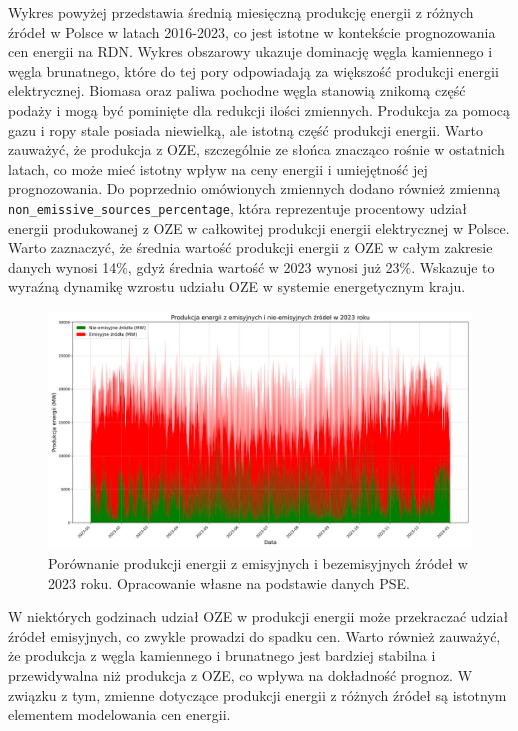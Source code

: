 Wykres powyżej przedstawia średnią miesięczną produkcję energii z różnych źródeł w Polsce w latach 2016-2023, co jest istotne w kontekście prognozowania cen energii na RDN. Wykres obszarowy ukazuje dominację węgla kamiennego i węgla brunatnego, które do tej pory odpowiadają za większość produkcji energii elektrycznej. Biomasa oraz paliwa pochodne węgla stanowią znikomą część podaży i mogą być pominięte dla redukcji ilości zmiennych. Produkcja za pomocą gazu i ropy stale posiada niewielką, ale istotną część produkcji energii. Warto zauważyć, że produkcja z OZE, szczególnie ze słońca znacząco rośnie w ostatnich latach, co może mieć istotny wpływ na ceny energii i umiejętność jej prognozowania. Do poprzednio omówionych zmiennych dodano również zmienną \texttt{non\_emissive\_sources\_percentage}, która reprezentuje procentowy udział energii produkowanej z OZE w całkowitej produkcji energii elektrycznej w Polsce. Warto zaznaczyć, że średnia wartość produkcji energii z OZE w całym zakresie danych wynosi 14\%, gdyż średnia wartość w 2023 wynosi już 23\%. Wskazuje to wyraźną dynamikę wzrostu udziału OZE w systemie energetycznym kraju.
\begin{figure}[H]
    \centering
    \includegraphics[width=\textwidth]{../plots/energy/emission_vs_non_emission_2023_high_res.png}
    \caption{Porównanie produkcji energii z emisyjnych i bezemisyjnych źródeł w 2023 roku. Opracowanie własne na podstawie danych PSE.}
    \label{fig:emission-vs-non-emission-2023}
\end{figure}
W niektórych godzinach udział OZE w produkcji energii może przekraczać udział źródeł emisyjnych, co zwykle prowadzi do spadku cen. Warto również zauważyć, że produkcja z węgla kamiennego i brunatnego jest bardziej stabilna i przewidywalna niż produkcja z OZE, co wpływa na dokładność prognoz. W związku z tym, zmienne dotyczące produkcji energii z różnych źródeł są istotnym elementem modelowania cen energii.

